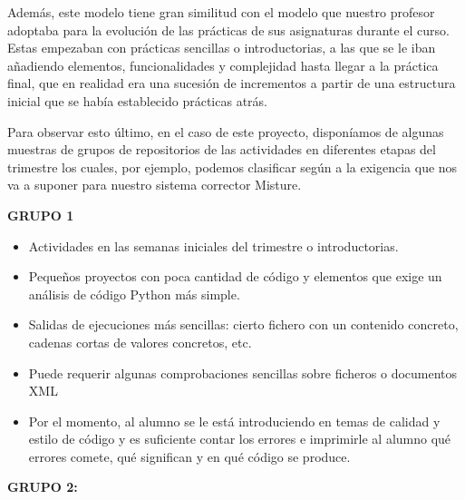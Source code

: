 Además, este modelo tiene gran similitud con el modelo que nuestro profesor adoptaba para la evolución de las prácticas de sus asignaturas durante el curso. Estas empezaban con prácticas sencillas o introductorias, a las que se le iban añadiendo elementos, funcionalidades y complejidad hasta llegar a la práctica final, que en realidad era una sucesión de incrementos a partir de una estructura inicial que se había establecido prácticas atrás.


Para observar esto último, en el caso de este proyecto, disponíamos de algunas muestras de grupos de repositorios de las actividades en diferentes etapas del trimestre los cuales, por ejemplo, podemos clasificar según a la exigencia que nos va a suponer para nuestro sistema corrector Misture. \newpage	%




\textbf{GRUPO 1}


\begin{itemize}
\item Actividades en las semanas iniciales del trimestre o introductorias.

\item Pequeños proyectos con poca cantidad de código y elementos que exige un análisis de código Python más simple.

\item Salidas de ejecuciones más sencillas: cierto fichero con un contenido concreto, cadenas cortas de valores concretos, etc.

\item Puede requerir algunas comprobaciones sencillas sobre ficheros o documentos XML

\item Por el momento, al alumno se le está introduciendo en temas de calidad y estilo de código y es suficiente contar los errores e imprimirle al alumno qué errores comete, qué significan y en qué código se produce.
\end{itemize}

\vspace{1cm}
\textbf{GRUPO 2:}


